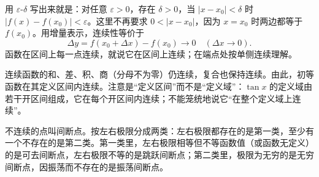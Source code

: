 用 $\varepsilon$-$\delta$ 写出来就是：对任意 $\varepsilon>0$，存在 $\delta>0$，当 $|x-x_0|<\delta$ 时 $|f(x)-f(x_0)|<\varepsilon$。这里不再要求 $0<|x-x_0|$，因为 $x=x_0$ 时两边都等于 $f(x_0)$。用增量表示，连续性等价于
\[
    \Delta y=f(x_0+\Delta x)-f(x_0)\to0\quad(\Delta x\to0).
\]
函数在区间上每一点连续，就说它在区间上连续；在端点处按单侧连续理解。

连续函数的和、差、积、商（分母不为零）仍连续，复合也保持连续。由此，初等函数在其定义区间内连续。注意是“定义区间”而不是“定义域”：$\tan x$ 的定义域由若干开区间组成，它在每个开区间内连续；不能笼统地说它“在整个定义域上连续”。

不连续的点叫间断点。按左右极限分成两类：左右极限都存在的是第一类，至少有一个不存在的是第二类。第一类里，左右极限相等但不等函数值（或函数无定义）的是可去间断点，左右极限不等的是跳跃间断点；第二类里，极限为无穷的是无穷间断点，因振荡而不存在的是振荡间断点。

